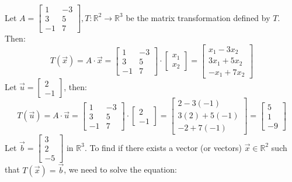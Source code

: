 \begin{eg}
    Let $A = \begin{bmatrix}
        1 & -3 \\
        3 & 5 \\
        -1 & 7
    \end{bmatrix}, T: \mathbb{R}^2 \to \mathbb{R}^3$ be the matrix transformation defined by $T$. Then:
    \[
        T(\vec{x}) = A \cdot \vec{x} = \begin{bmatrix}
            1 & -3 \\
            3 & 5 \\
            -1 & 7
        \end{bmatrix} \cdot \begin{bmatrix} x_1 \\ x_2 \end{bmatrix} = \begin{bmatrix}
            x_1 - 3x_2 \\
            3x_1 + 5x_2 \\
            -x_1 + 7x_2
        \end{bmatrix}
    \]
    Let $\vec{u} = \begin{bmatrix} 2 \\ -1 \end{bmatrix}$, then:
    \[
        T(\vec{u}) = A \cdot \vec{u} = \begin{bmatrix}
            1 & -3 \\
            3 & 5 \\
            -1 & 7
        \end{bmatrix} \cdot \begin{bmatrix} 2 \\ -1 \end{bmatrix} = \begin{bmatrix}
            2 - 3(-1) \\
            3(2) + 5(-1) \\
            -2 + 7(-1)
        \end{bmatrix} = \begin{bmatrix}
            5 \\ 1 \\ -9
        \end{bmatrix}
    \]
    Let $\vec{b} = \begin{bmatrix} 3 \\ 2 \\ -5 \end{bmatrix}$ in $\mathbb{R}^3$. To find if there exists a vector (or vectors) $\vec{x} \in \mathbb{R}^2$ such that $T(\vec{x}) = \vec{b}$, we need to solve the equation:

\end{eg}
